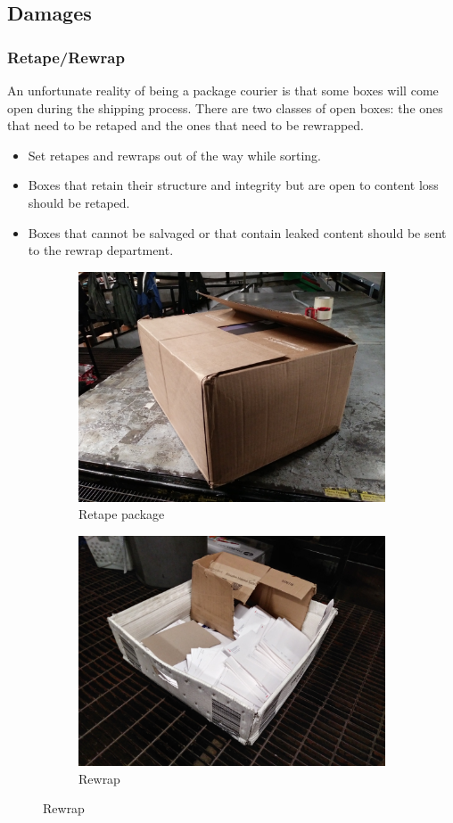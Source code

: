 \documentclass[12pt]{article}
\begin{document}
\subsection{Damages}

\subsubsection{Retape/Rewrap}
An unfortunate reality of being a package courier is that some boxes will come open during the shipping process. There are two classes of open boxes: the ones that need to be retaped and the ones that need to be rewrapped. 

\begin{itemize}
    \item Set retapes and rewraps out of the way while sorting.
    \item Boxes that retain their structure and integrity but are open to content loss should be retaped.
    \item Boxes that cannot be salvaged or that contain leaked content should be sent to the rewrap department.
\end{itemize}

\begin{figure}[H]
\begin{subfigure}{0.5\textwidth}
\centering
\includegraphics[width=0.7\linewidth]{20171221_160603} 
\caption{Retape package}
\end{subfigure}
\begin{subfigure}{0.5\textwidth}
\centering
\includegraphics[width=0.7\linewidth]{20171222_013019_HDR}
\caption{Rewrap}
\end{subfigure}
\end{figure}
\end{document}
